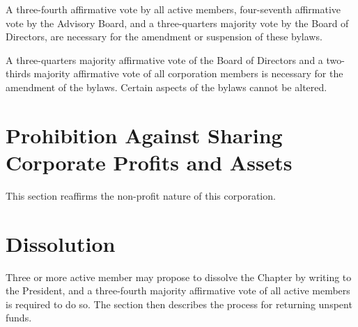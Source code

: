 \documentclass{article}
\begin{document}
	A three-fourth affirmative vote by all active members, four-seventh affirmative vote by the Advisory Board, and a three-quarters majority vote by the Board of Directors, are necessary for the amendment or suspension of these bylaws.
	
	A three-quarters majority affirmative vote of the Board of Directors and a two-thirds majority affirmative vote of all corporation members is necessary for the amendment of the bylaws. Certain aspects of the bylaws cannot be altered.
	
	
	\section{Prohibition Against Sharing Corporate Profits and Assets}
	This section reaffirms the non-profit nature of this corporation.
	
	\section{Dissolution}
	Three or more active member may propose to dissolve the Chapter by writing to the President, and a three-fourth majority affirmative vote of all active members is required to do so. The section then describes the process for returning unspent funds.
	
\end{document}
